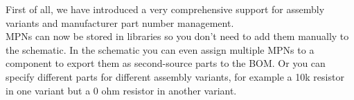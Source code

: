 \begin{frame}{\secname}
{    First of all, we have introduced a very comprehensive support for assembly
    variants and manufacturer part number management.\\

    MPNs can now be stored in libraries so you don't need to add
    them manually to the schematic. In the schematic you can even assign
    multiple MPNs to a component to export them as second-source parts to
    the BOM. Or you can specify different parts for different assembly variants,
    for example a 10k resistor in one variant but a 0 ohm resistor in another
    variant.
  }


\end{frame}
